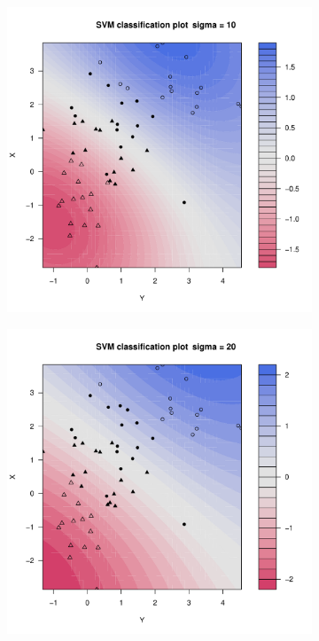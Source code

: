\begin{figure}[H]
\begin{subfigure}{0.24\linewidth}
		\caption{}
	\end{subfigure}
	\begin{subfigure}{0.24\linewidth}
		\includegraphics[width=1\linewidth]{Graphics/Problema_01/Experiment_03_3.pdf}
		\caption{}
	\end{subfigure}
	\begin{subfigure}{0.24\linewidth}
		\includegraphics[width=1\linewidth]{Graphics/Problema_01/Experiment_03_4.pdf}
		\caption{}
	\end{subfigure}
	\caption{}
\end{figure}

